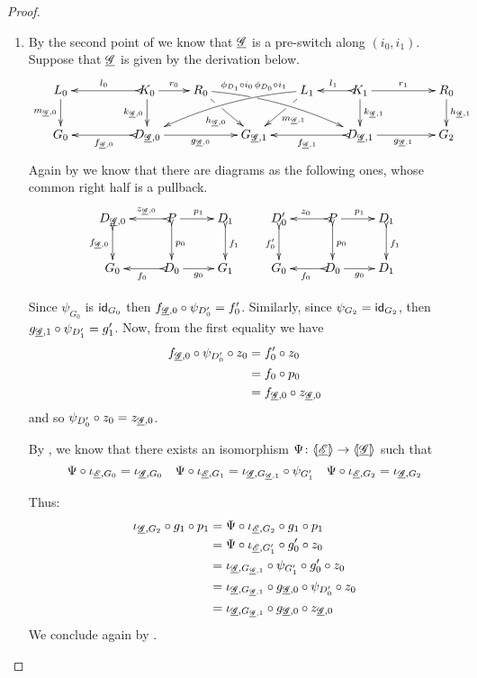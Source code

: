 \begin{proof}
\begin{enumerate}
	\item By the second point of  we know that $\underline{\mathscr{G}}$ is a pre-switch along $(i_0, i_1)$. Suppose that $\underline{\mathscr{G}}$ is given by the derivation below.
	\[
	\xymatrix@R=20pt@C=20pt{
		{L_0} \ar[d]_{m_{\der{G}, 0}}
		&&  {K_0} \ar@{>->}[ll]_{l_0} \ar[r]^{r_0} \ar[d]_{k_{\der{G}, 0}}
		&  {R_0} \ar[dr]|(.33)\hole_{h_{\der{G}, 0}}  \ar@/^.25cm/@{>}^(.2){\phi_{D_1} \circ i_0}|(.32)\hole[drrr]
		& & 
		{L_1}\ar[dl]|(.33)\hole^{m_{\der{G}, 1}} \ar@/_.25cm/[dlll]_(.2){\phi_{D_0} \circ i_1} 
		&  {K_1} \ar@{>->}[l]_{l_1} \ar[rr]^{r_1} \ar[d]^{k_{\der{G}, 1}}
		& & {R_0} \ar[d]^{h_{\der{G}, 1}} \\		
		{G_0}
		& & {D_{\der{G},0}} \ar@{>->}[ll]^{f_{\der{G}, 0}} \ar[rr]_{g_{\der{G}, 0}}
		& &  {G_{\der{G}, 1}} 
		& &  {D_{\der{G}, 1}} \ar@{>->}[ll]^{f_{\der{G}, 1}} \ar[rr]_{g_{\der{G}, 1}}
		& & {G_2}  }
	\]
	Again by  we know that there are diagrams as the following ones, whose common right half is a pullback.
\[\xymatrix{D_{\der{G},0} \ar@{>->}[d]_{f_{\der{G},0}}& P \ar@{>->}[d]^{p_{0}} \ar[r]^{p_1}\ar@{>->}[l]_-{z_{\der{G},0}} & D_{1} \ar@{>->}[d]^{f_{1}}& D'_0 \ar@{>->}[d]_{f'_0} & P \ar[r]^{p_1} \ar@{>->}[d]^{p_0} \ar@{>->}[l]_{z_0}& D_1 \ar@{>->}[d]^{f_1}\\ G_0 & D_{0} \ar[r]_{g_{0}} \ar@{>->}[l]^{f_{0}} & G_{1} & G_0 & D_0 \ar[r]_{g_{0}} \ar@{>->}[l]^{f_{0}} & D_1}\]

Since $\psi_{G_0}$ is $\mathsf{id}_{G_0}$ then $f_{\underline{\mathscr{G}},0}\circ \psi_{D'_0}=f'_0$. Similarly, since $\psi_{G_2}=\mathsf{id}_{G_2}$, then $g_{\underline{\mathscr{G}},1}\circ \psi_{D'_1}=g'_1$. Now, from the first equality we have
\begin{align*}
	f_{\underline{\mathscr{G}},0} \circ \psi_{D'_0}\circ z_0&=f'_0 \circ z_0\\&= f_0\circ p_0\\&=f_{\underline{\mathscr{G}},0} \circ z_{\underline{\mathscr{G}},0}
\end{align*}
and so $\psi_{D'_0}\circ z_0=z_{\underline{\mathscr{G}},0}$. 

By , we know that there exists an isomorphism $\Psi\colon \langle \hspace{-1.85pt}[ \underline{\mathscr{E}}]\hspace{-1.85pt}\rangle\to \langle \hspace{-1.85pt}[ \underline{\mathscr{G}}]\hspace{-1.85pt}\rangle$ such that
\[\Psi \circ \iota_{\underline{\mathscr{E}}, G_0}=\iota_{\underline{\mathscr{G}}, G_0} \quad \Psi \circ \iota_{\underline{\mathscr{E}}, G_1}=\iota_{\underline{\mathscr{G}}, G_{\underline{\mathscr{G}},1}}\circ \psi_{G'_1} \quad \Psi \circ \iota_{\underline{\mathscr{E}}, G_2}=\iota_{\underline{\mathscr{G}}, G_2} \]

Thus:
\begin{align*}
	\iota_{\underline{\mathscr{G}},G_2}\circ g_1\circ p_1&= \Psi \circ \iota_{\underline{\mathscr{E}}, G_2}\circ g_1\circ p_1\\&=\Psi \circ \iota_{\underline{\mathscr{E}}, G'_1} \circ g'_0\circ z_0\\&=\iota_{\underline{\mathscr{G}}, G_{\underline{\mathscr{G}},1}}\circ \psi_{G'_1}\circ g'_0\circ z_0\\&=\iota_{\underline{\mathscr{G}}, G_{\underline{\mathscr{G}},1}}\circ g_{\underline{\mathscr{G}},0}\circ \psi_{D'_0}\circ z_0\\&=\iota_{\underline{\mathscr{G}}, G_{\underline{\mathscr{G}},1}}\circ g_{\underline{\mathscr{G}},0}\circ z_{\underline{\mathscr{G}},0}
\end{align*}
	We conclude again by .\qedhere 
\end{enumerate}
 \end{proof}


